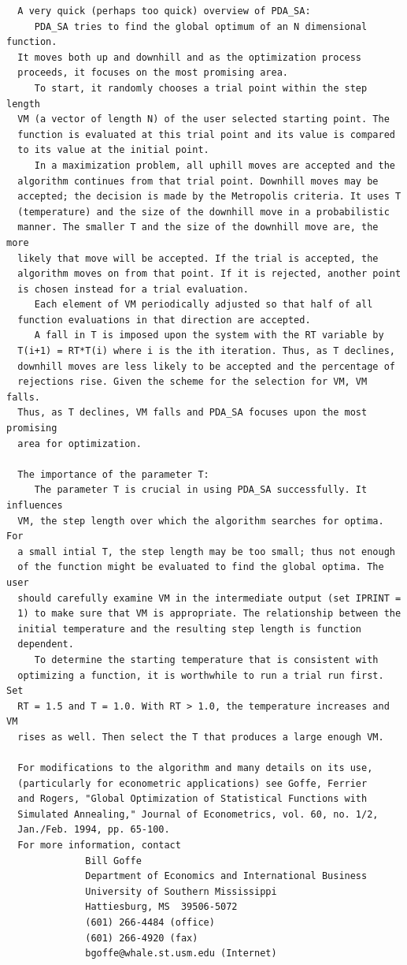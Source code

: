 \documentclass[11pt,twoside]{article}
\begin{document}
\begin{verbatim}
  A very quick (perhaps too quick) overview of PDA_SA:
     PDA_SA tries to find the global optimum of an N dimensional function.
  It moves both up and downhill and as the optimization process
  proceeds, it focuses on the most promising area.
     To start, it randomly chooses a trial point within the step length
  VM (a vector of length N) of the user selected starting point. The
  function is evaluated at this trial point and its value is compared
  to its value at the initial point.
     In a maximization problem, all uphill moves are accepted and the
  algorithm continues from that trial point. Downhill moves may be
  accepted; the decision is made by the Metropolis criteria. It uses T
  (temperature) and the size of the downhill move in a probabilistic
  manner. The smaller T and the size of the downhill move are, the more
  likely that move will be accepted. If the trial is accepted, the
  algorithm moves on from that point. If it is rejected, another point
  is chosen instead for a trial evaluation.
     Each element of VM periodically adjusted so that half of all
  function evaluations in that direction are accepted.
     A fall in T is imposed upon the system with the RT variable by
  T(i+1) = RT*T(i) where i is the ith iteration. Thus, as T declines,
  downhill moves are less likely to be accepted and the percentage of
  rejections rise. Given the scheme for the selection for VM, VM falls.
  Thus, as T declines, VM falls and PDA_SA focuses upon the most promising
  area for optimization.

  The importance of the parameter T:
     The parameter T is crucial in using PDA_SA successfully. It influences
  VM, the step length over which the algorithm searches for optima. For
  a small intial T, the step length may be too small; thus not enough
  of the function might be evaluated to find the global optima. The user
  should carefully examine VM in the intermediate output (set IPRINT =
  1) to make sure that VM is appropriate. The relationship between the
  initial temperature and the resulting step length is function
  dependent.
     To determine the starting temperature that is consistent with
  optimizing a function, it is worthwhile to run a trial run first. Set
  RT = 1.5 and T = 1.0. With RT > 1.0, the temperature increases and VM
  rises as well. Then select the T that produces a large enough VM.

  For modifications to the algorithm and many details on its use,
  (particularly for econometric applications) see Goffe, Ferrier
  and Rogers, "Global Optimization of Statistical Functions with
  Simulated Annealing," Journal of Econometrics, vol. 60, no. 1/2, 
  Jan./Feb. 1994, pp. 65-100.
  For more information, contact 
              Bill Goffe
              Department of Economics and International Business
              University of Southern Mississippi 
              Hattiesburg, MS  39506-5072 
              (601) 266-4484 (office)
              (601) 266-4920 (fax)
              bgoffe@whale.st.usm.edu (Internet)


\end{verbatim}
\end{document}
